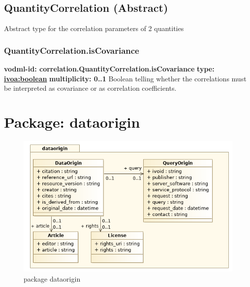   \subsection{QuantityCorrelation (Abstract)}
  \label{sect:correlation.QuantityCorrelation}
    Abstract type for the correlation parameters of 2 quantities

    \subsubsection{QuantityCorrelation.isCovariance}
      \textbf{vodml-id: correlation.QuantityCorrelation.isCovariance} \newline
      \textbf{type: \hyperref[sect:ivoa]{ivoa:boolean}} \newline
      \textbf{multiplicity: 0..1} \newline 
      Boolean telling whether the correlations must be interpreted as covariance or as correlation coefficients.

\pagebreak
\section{Package: dataorigin }
  \begin{figure}[h]
    \includegraphics[width=1.0\textwidth]{../model/dataorigin.png}
    \caption{package dataorigin}
    \label{fig:dataorigin}
  \end{figure}




